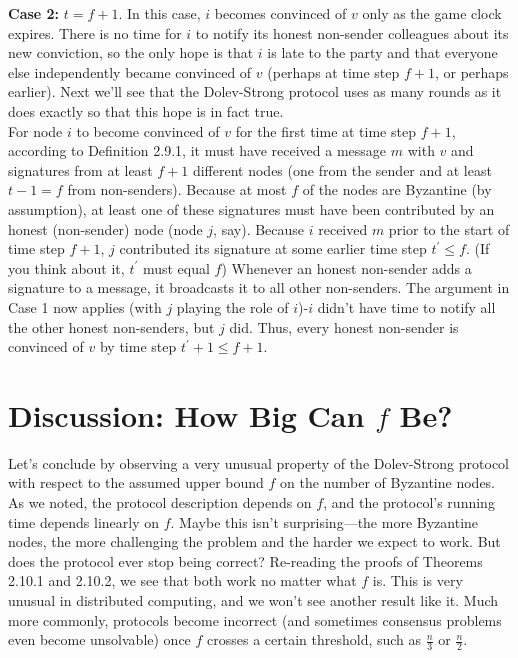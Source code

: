 {\begin{myproof}
\noindent
\textbf{Case 2:} $t = f + 1$. In this case, $i$ becomes convinced of $v$ only as the game clock expires.
There is no time for $i$ to notify its honest non-sender colleagues about its new conviction,
so the only hope is that $i$ is late to the party and that everyone else independently became
convinced of $v$ (perhaps at time step $f + 1$, or perhaps earlier). Next we’ll see that the
Dolev-Strong protocol uses as many rounds as it does exactly so that this hope is in fact
true.\\
For node $i$ to become convinced of $v$ for the first time at time step $f + 1$, according to
Definition 2.9.1, it must have received a message $m$ with $v$ and signatures from at least $f + 1$
different nodes (one from the sender and at least $t - 1 = f$ from non-senders). Because at
most $f$ of the nodes are Byzantine (by assumption), at least one of these signatures must have
been contributed by an honest (non-sender) node (node $j$, say). Because $i$ received $m$ prior
to the start of time step $f + 1$, $j$ contributed its signature at some earlier time step $t^{'} \leq f$.
(If you think about it, $t^{'}$ must equal $f$) Whenever an honest non-sender adds a signature
to a message, it broadcasts it to all other non-senders. The argument in Case 1 now applies
(with $j$ playing the role of $i$)-$i$ didn't have time to notify all the other honest non-senders,
but $j$ did. Thus, every honest non-sender is convinced of $v$ by time step $t^{'} + 1 \leq f + 1$.
\end{myproof}
}

\newpage
\section{ Discussion: How Big Can $f$ Be?}
Let’s conclude by observing a very unusual property of the Dolev-Strong protocol with
respect to the assumed upper bound $f$ on the number of Byzantine nodes. As we noted, the
protocol description depends on $f$, and the protocol’s running time depends linearly on $f$.
Maybe this isn't surprising—the more Byzantine nodes, the more challenging the problem
and the harder we expect to work. But does the protocol ever stop being correct?
Re-reading the proofs of Theorems 2.10.1 and 2.10.2, we see that both work no matter what $f$
is. This is very unusual in distributed computing, and we won’t see another result like it.
Much more commonly, protocols become incorrect (and sometimes consensus problems even
become unsolvable) once $f$ crosses a certain threshold, such as $\frac{n}{3}$ or $\frac{n}{2}$.\\

